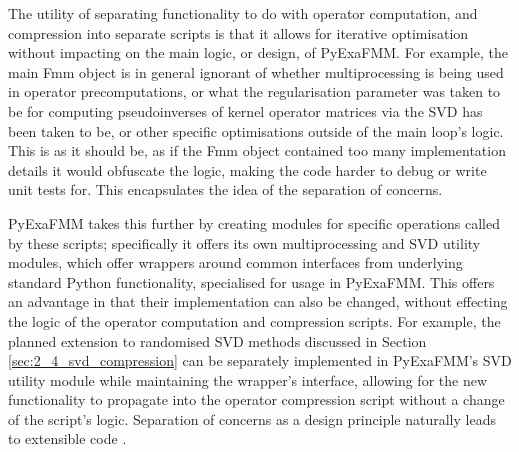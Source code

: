 The utility of separating functionality to do with operator computation, and
compression into separate scripts is that it allows for iterative optimisation
without impacting on the main logic, or design, of \gls{PyExaFMM}. For example,
the main Fmm object is in general ignorant of whether multiprocessing
is being used in operator precomputations, or what the regularisation parameter
was taken to be for computing pseudoinverses of kernel operator matrices
via the SVD has been taken to be, or other specific optimisations outside of the
main loop's logic. This is as it should be, as if the Fmm
object contained too many implementation details it would obfuscate the logic,
making the code harder to debug or write unit tests for. This
encapsulates the idea of the separation of concerns.

\gls{PyExaFMM} takes this further by creating modules for specific
operations called by these scripts; specifically it offers its own multiprocessing
and SVD utility modules, which offer wrappers around common interfaces from
underlying standard Python functionality, specialised for usage in \gls{PyExaFMM}.
This offers an advantage in that their implementation can also be changed,
without effecting the logic of the operator computation and compression scripts.
For example, the planned extension to randomised \gls{SVD} methods discussed in
Section \ref{sec:2_4_svd_compression} can be separately implemented in \gls{PyExaFMM}'s
\gls{SVD} utility module while maintaining the wrapper's interface, allowing for the new
functionality to propagate into the operator compression script without
a change of the script's logic. Separation of concerns as a design
principle naturally leads to extensible code \cite{Gamma:1994:Addison}.
